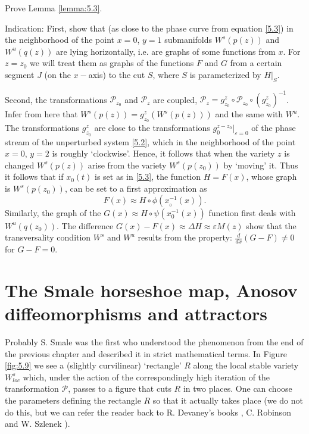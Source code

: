 \begin{task}
	Prove Lemma \ref{lemma:5.3}.
	
	Indication: First, show that (as close to the phase curve from equation \eqref{5.3}) in the neighborhood of the point $x = 0$, $y = 1$ submanifolds $W^{s}(p(z))$ and $W^{u}(q(z))$ are lying horizontally, i.e. are graphs of some functions from $x$. For $z = z_0$ we will treat them as graphs of the functions $F$ and $G$ from a certain segment $J$ (on the $x-$axis) to the cut $S$, where $S$ is parameterized by $H|_{S}$.
	
	Second, the transformations $\mathcal{P}_{z_{0}}$ and $\mathcal{P}_{z}$ are coupled, $\mathcal{P}_{z} = g_{z_{0}}^{z}\circ \mathcal{P}_{z_{0}} \circ \left( g_{z_{0}}^{z}\right) ^{-1}$. Infer from here that $W^{s}(p(z))=g_{z_{0}}^{z}(W^{s}(p(z)))$ and the same with $W^{u}$. The transformations $g_{z_{0}}^{z}$ are close to the transformations $g_{0}^{z-z_{0}}|_{\varepsilon =0}$ of the phase stream of the unperturbed system \eqref{5.2}, which in the neighborhood of the point $x = 0$, $y = 2$ is roughly `clockwise'. Hence, it follows that when the variety $z$ is changed $W^{s}(p(z))$ arise from the variety $W^{s}(p(z_{0}))$ by `moving' it. Thus it follows that if $x_{0}(t)$ is set as in \eqref{5.3}, the function $H=F(x)$, whose graph is $W^{s}(p(z_{0}))$, can be set to a first approximation as
	$$
	F(x)\approx H\circ \phi \left( x_{_{0}}^{-1}(x)\right) .
	$$
	Similarly, the graph of the $G(x) \approx H \circ \psi \left( x_{0}^{-1} (x)\right)$ function first deals with $W^{u}(q(z_{0}))$. The difference $G(x)-F(x)\approx \Delta H\approx \varepsilon M(z)$ show that the transversality condition $W^{s}$ and $W^{u}$ results from the property: $\frac{d}{dx}\left( G-F\right) \not=0$ for $G-F=0$.
\end{task}


\section{The Smale horseshoe map, Anosov diffeomorphisms and attractors}

Probably S. Smale was the first who understood the phenomenon from the end of the previous chapter and described it in strict mathematical terms. In Figure \ref{fig:5.9} we see a (slightly curvilinear) `rectangle' $R$ along the local stable variety $W_{loc}^{s}$ which, under the action of the correspondingly high iteration of the transformation $\mathcal{P}$, passes to a figure that cuts $R$ in two places. One can choose the parameters defining the rectangle $R$ so that it actually takes place (we do not do this, but we can refer the reader back to R. Devaney's books \cite{Dev}, C. Robinson \cite{Rob} and W. Szlenek \cite{Szl}).

